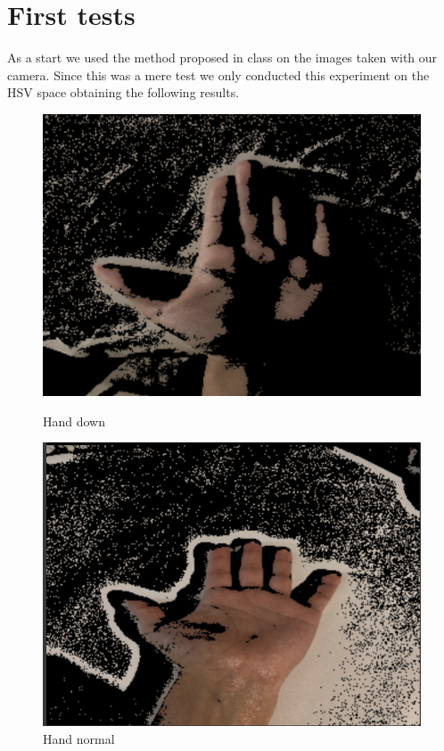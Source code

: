 \documentclass{report}
\begin{document}
\section{First tests}
As a start we used the method proposed in class on the images taken with our camera. Since this was
a mere test we only conducted this experiment on the HSV space obtaining the following results.
\begin{figure}[H]
    \includegraphics[width=\linewidth]{Images/hand_downHSV_J.png}
    \caption{Hand down}
  \endminipage\hfill
    \includegraphics[width=\linewidth]{Images/hand_normalHSV_J.png}
    \caption{Hand normal}
  \endminipage\hfill

\end{figure}
\end{document}
